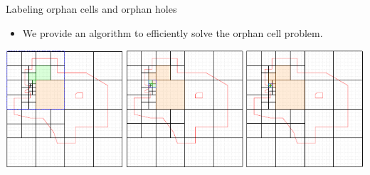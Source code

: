 \documentclass{beamer}
\begin{document}
    \begin{frame}{Labeling orphan cells and orphan holes}
        \begin{itemize}
            \item We provide an algorithm to efficiently solve the orphan cell problem.
        \end{itemize}
        \vspace{0.5cm}

        \centering
        \includegraphics[width=\textwidth]{figures/holes2}
    \end{frame}
\end{document}
